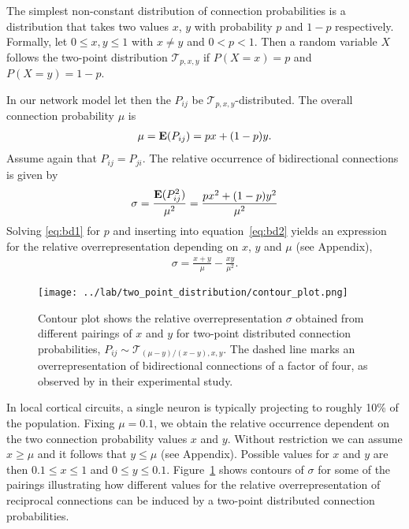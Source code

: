 
The simplest non-constant distribution of connection probabilities is a distribution that takes two values $x$, $y$ with probability $p$ and $1-p$ respectively. Formally, let $0 \leq x,y \leq 1$ with $x \neq y$  and $0 < p < 1$. Then a random variable $X$ follows the two-point distribution %
$\mathcal{T}_{p,x,y}$  if $P(X=x)=p$ and $P(X=y) = 1-p$. 

In our network model let then the $P_{ij}$ be $\mathcal{T}_{p,x,y}$-distributed. The overall connection probability $\mu$ is
\begin{align}
\mu = \operatorname{\mathbf{E}}(P_{ij}) = px + (1-p)y. \label{eq:bd1}
\end{align}
Assume again that $P_{ij} = P_{ji}$. The relative occurrence of bidirectional connections is given by
\begin{align}
  \sigma = \frac{\operatorname{\mathbf{E}}(P_{ij}^2)}{\mu^2} = \frac{p x^2 + (1-p) y^2}{\mu^2} \label{eq:bd2}
\end{align}
Solving \eqref{eq:bd1} for $p$ and inserting into equation~\eqref{eq:bd2} yields an expression for the relative overrepresentation depending on $x$, $y$ and $\mu$ (see Appendix),
\begin{align}
\sigma = \frac{x+y}{\mu} - \frac{xy}{\mu^2}.
\end{align}

\begin{figure}[h!]
\centering
\texttt{[image: ../lab/two\_point\_distribution/contour\_plot.png]}
\caption{Contour plot shows the relative overrepresentation $\sigma$ obtained from different pairings of $x$ and $y$ for two-point distributed connection probabilities, $P_{ij} \sim \mathcal{T}_{(\mu-y)/(x-y),x,y}$. The dashed line marks an overrepresentation of bidirectional connections of a factor of four, as observed by \cite{Song2005} in their experimental study.}
\label{fig:tp}
\end{figure}

In local cortical circuits, a single neuron is typically projecting to roughly 10\% of the population. Fixing $\mu = 0.1$, we obtain the relative occurrence dependent on the two connection probability values $x$ and $y$. Without restriction we can assume $x \geq \mu$ and it follows that $y \leq \mu$ (see Appendix). Possible values for $x$ and $y$ are then $0.1 \leq x \leq 1$ and $0 \leq y \leq 0.1$. Figure~\ref{fig:tp} shows contours of $\sigma$ for some of the pairings illustrating how different values for the relative overrepresentation of reciprocal connections can be induced by a two-point distributed connection probabilities.  





